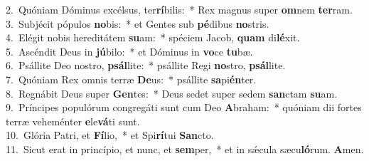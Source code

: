 {2.~}Quóniam Dóminus excélsus, ter\textbf{rí}bilis:~* Rex magnus super \textbf{om}nem \textbf{ter}ram.\\
{3.~}Subjécit pópulos \textbf{no}bis:~* et Gentes sub \textbf{pé}dibus \textbf{no}stris.\\
{4.~}Elégit nobis hereditátem \textbf{su}am:~* spéciem Jacob, \textbf{quam} di\textbf{lé}xit.\\
{5.~}Ascéndit Deus in \textbf{jú}bilo:~* et Dóminus in \textbf{vo}ce \textbf{tu}bæ.\\
{6.~}Psállite Deo nostro, \textbf{psál}lite:~* psállite Regi \textbf{no}stro, \textbf{psál}lite.\\
{7.~}Quóniam Rex omnis terræ \textbf{De}us:~* psállite \textbf{sa}pi\textbf{én}ter.\\
{8.~}Regnábit Deus super \textbf{Gen}tes:~* Deus sedet super sedem \textbf{san}ctam \textbf{su}am.\\
{9.~}Príncipes populórum congregáti sunt cum Deo \textbf{A}braham:~* quóniam dii fortes terræ veheménter \textbf{e}le\textbf{vá}ti sunt.\\
{10.~}Glória Patri, et \textbf{Fí}lio,~* et Spi\textbf{rí}tui \textbf{San}cto.\\
{11.~}Sicut erat in princípio, et nunc, et \textbf{sem}per,~* et in sǽcula sæcu\textbf{ló}rum. \textbf{A}men.\\
